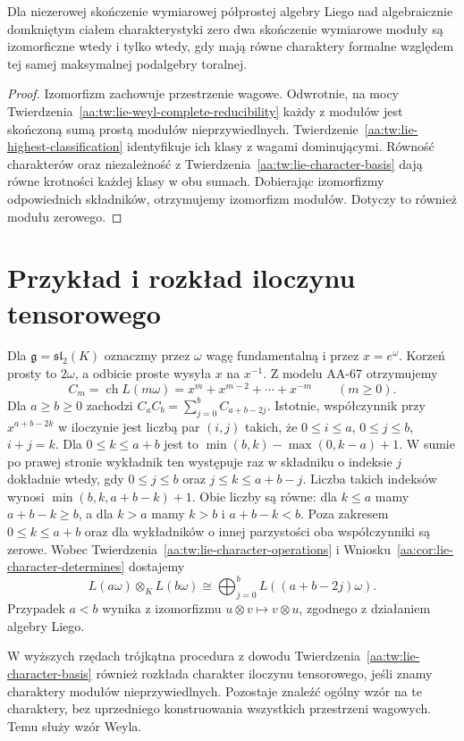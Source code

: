 \begin{wniosek}
\label{aa:cor:lie-character-determines}
Dla niezerowej skończenie wymiarowej półprostej algebry Liego nad algebraicznie domkniętym ciałem charakterystyki zero dwa skończenie wymiarowe moduły są izomorficzne wtedy i tylko wtedy, gdy mają równe charaktery formalne względem tej samej maksymalnej podalgebry toralnej.
\end{wniosek}
\begin{proof}
Izomorfizm zachowuje przestrzenie wagowe. Odwrotnie, na mocy Twierdzenia~\ref{aa:tw:lie-weyl-complete-reducibility} każdy z modułów jest skończoną sumą prostą modułów nieprzywiedlnych. Twierdzenie~\ref{aa:tw:lie-highest-classification} identyfikuje ich klasy z wagami dominującymi. Równość charakterów oraz niezależność z Twierdzenia~\ref{aa:tw:lie-character-basis} dają równe krotności każdej klasy w obu sumach. Dobierając izomorfizmy odpowiednich składników, otrzymujemy izomorfizm modułów. Dotyczy to również modułu zerowego.
\end{proof}

\section{Przykład i rozkład iloczynu tensorowego}

\begin{przyklad}
\label{aa:prz:lie-character-sl2}
Dla $\mathfrak g=\mathfrak{sl}_2(K)$ oznaczmy przez $\omega$ wagę fundamentalną i przez $x=e^\omega$. Korzeń prosty to $2\omega$, a odbicie proste wysyła $x$ na $x^{-1}$. Z modelu AA-67 otrzymujemy
\[
 C_m=\operatorname{ch}L(m\omega)=x^m+x^{m-2}+\cdots+x^{-m}
 \qquad(m\ge0).
\]
Dla $a\ge b\ge0$ zachodzi $C_a C_b=\sum_{j=0}^{b}C_{a+b-2j}$. Istotnie, współczynnik przy $x^{a+b-2k}$ w iloczynie jest liczbą par $(i,j)$ takich, że $0\le i\le a$, $0\le j\le b$, $i+j=k$. Dla $0\le k\le a+b$ jest to
$\min(b,k)-\max(0,k-a)+1$. W sumie po prawej stronie wykładnik ten występuje raz w składniku o indeksie $j$ dokładnie wtedy, gdy $0\le j\le b$ oraz $j\le k\le a+b-j$. Liczba takich indeksów wynosi $\min(b,k,a+b-k)+1$. Obie liczby są równe: dla $k\le a$ mamy $a+b-k\ge b$, a dla $k>a$ mamy $k>b$ i $a+b-k<b$. Poza zakresem $0\le k\le a+b$ oraz dla wykładników o innej parzystości oba współczynniki są zerowe. Wobec Twierdzenia~\ref{aa:tw:lie-character-operations} i Wniosku~\ref{aa:cor:lie-character-determines} dostajemy
\[
 L(a\omega)\otimes_K L(b\omega)
 \cong \bigoplus_{j=0}^b L((a+b-2j)\omega).
\]
Przypadek $a<b$ wynika z izomorfizmu $u\otimes v\mapsto v\otimes u$, zgodnego z działaniem algebry Liego.
\end{przyklad}

W wyższych rzędach trójkątna procedura z dowodu Twierdzenia~\ref{aa:tw:lie-character-basis} również rozkłada charakter iloczynu tensorowego, jeśli znamy charaktery modułów nieprzywiedlnych. Pozostaje znaleźć ogólny wzór na te charaktery, bez uprzedniego konstruowania wszystkich przestrzeni wagowych. Temu służy wzór Weyla.
